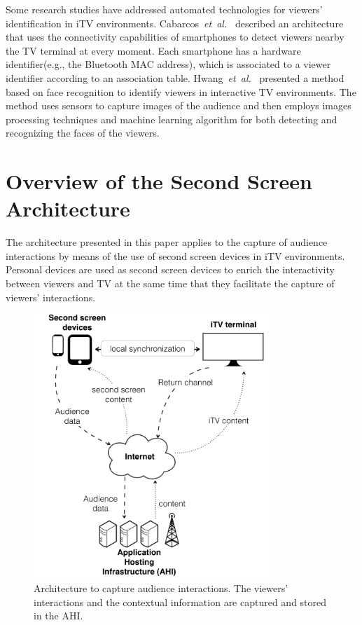 \documentclass[journal]{IEEEtran}
\begin{document}
Some research studies have addressed automated technologies for viewers' identification in iTV environments. Cabarcos~\emph{et~al.}~\cite{Cabarcos2011} described an architecture that uses the connectivity capabilities of smartphones to detect viewers nearby the TV terminal at every moment. Each smartphone has a hardware identifier(e.g., the Bluetooth MAC address), which is associated to a viewer identifier according to an association table. Hwang~\emph{et~al.}~\cite{Hwang2007} presented a method based on face recognition to identify viewers in interactive TV environments. The method uses sensors to capture images of the audience and then employs images processing techniques and machine learning algorithm for both detecting and recognizing the faces of the viewers.

\section{Overview of the Second Screen Architecture}
\label{sec_overview}


The architecture presented in this paper applies to the capture of audience interactions by means of the use of second screen devices in iTV environments. Personal devices are used as second screen devices to enrich the interactivity between viewers and TV at the same time that they facilitate the capture of viewers' interactions.

\begin{figure}[!t]
	\centering
	\includegraphics[width=3.5in]{img/architecture-overview.pdf}
	\caption{Architecture to capture audience interactions. The viewers' interactions and the contextual information are captured and stored in the AHI.}
	\label{fig_architecture}
\end{figure}
\end{document}
